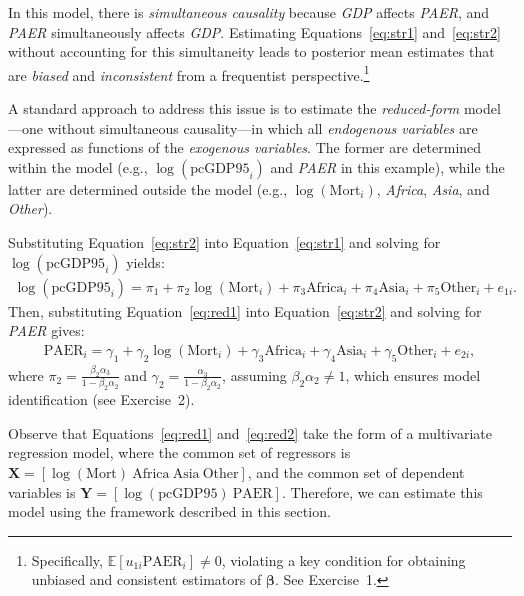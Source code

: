 In this model, there is \textit{simultaneous causality} because \textit{GDP} affects \textit{PAER}, and \textit{PAER} simultaneously affects \textit{GDP}. Estimating Equations~\ref{eq:str1} and~\ref{eq:str2} without accounting for this simultaneity leads to posterior mean estimates that are \textit{biased} and \textit{inconsistent} from a frequentist perspective.\footnote{Specifically, $\mathbb{E}[u_{1i}\text{PAER}_i] \neq 0$, violating a key condition for obtaining unbiased and consistent estimators of $\bm{\beta}$. See Exercise~1.} 

A standard approach to address this issue is to estimate the \textit{reduced-form} model—one without simultaneous causality—in which all \textit{endogenous variables} are expressed as functions of the \textit{exogenous variables}. The former are determined within the model (e.g., $\log(\text{pcGDP95}_i)$ and \textit{PAER} in this example), while the latter are determined outside the model (e.g., $\log(\text{Mort}_i)$, \textit{Africa}, \textit{Asia}, and \textit{Other}).

Substituting Equation~\ref{eq:str2} into Equation~\ref{eq:str1} and solving for $\log(\text{pcGDP95}_i)$ yields:
\begin{align}\label{eq:red1}
	\log(\text{pcGDP95}_i) = \pi_1 + \pi_2 \log(\text{Mort}_i) + \pi_3 \text{Africa}_i + \pi_4 \text{Asia}_i + \pi_5 \text{Other}_i + e_{1i}.
\end{align}
Then, substituting Equation~\ref{eq:red1} into Equation~\ref{eq:str2} and solving for \textit{PAER} gives:
\begin{align}\label{eq:red2}
	\text{PAER}_i = \gamma_1 + \gamma_2 \log(\text{Mort}_i) + \gamma_3 \text{Africa}_i + \gamma_4 \text{Asia}_i + \gamma_5 \text{Other}_i + e_{2i},
\end{align}
where $\pi_2 = \frac{\beta_2 \alpha_3}{1 - \beta_2 \alpha_2}$ and $\gamma_2 = \frac{\alpha_3}{1 - \beta_2 \alpha_2}$, assuming $\beta_2 \alpha_2 \neq 1$, which ensures model identification (see Exercise~2).

Observe that Equations~\ref{eq:red1} and~\ref{eq:red2} take the form of a multivariate regression model, where the common set of regressors is $\bm{X} = \left[\log(\text{Mort}) \ \text{Africa} \ \text{Asia} \ \text{Other}\right]$, and the common set of dependent variables is $\bm{Y} = \left[\log(\text{pcGDP95}) \ \text{PAER}\right]$. Therefore, we can estimate this model using the framework described in this section.

